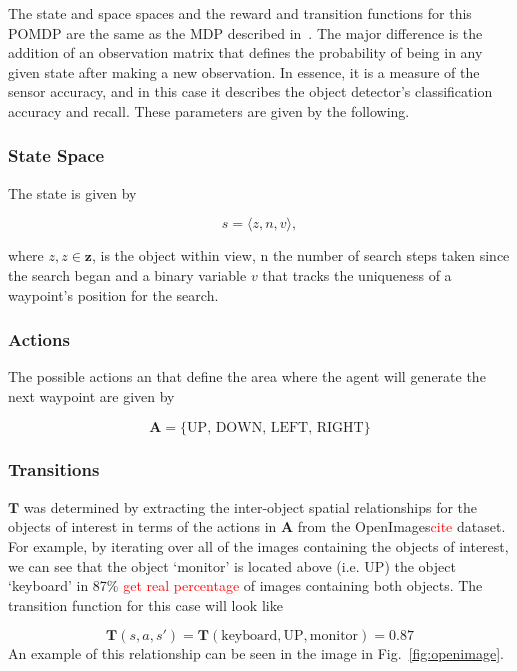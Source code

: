 \documentclass[runningheads]{llncs}
\newcommand\todo[1]{\textcolor{red}{#1}}
\begin{document}
The state and space spaces and the reward and transition functions for this POMDP are the same as the MDP described in~\cite{lock2019active}. 
The major difference is the addition of an observation matrix that defines the probability of being in any given state after making a new observation.
In essence, it is a measure of the sensor accuracy, and in this case it describes the object detector's classification accuracy and recall.
These parameters are given by the following. 

\subsubsection{State Space}

The state is given by

\begin{equation}
  s = \langle z, n, v \rangle,
\end{equation}

\noindent where $z, z\in\mathbf{z}$, is the object within view, n the number of search steps taken since the search began and a binary variable $v$ that tracks the uniqueness of a waypoint's position for the search.

\subsubsection{Actions}

The possible actions an that define the area where the agent will generate the next waypoint are given by

\begin{equation}
  \mathbf{A} = \{ \textrm{UP, DOWN, LEFT, RIGHT} \}
\end{equation}

\subsubsection{Transitions}

$\mathbf{T}$ was determined by extracting the inter-object spatial relationships for the objects of interest in terms of the actions in $\mathbf{A}$ from the OpenImages\todo{cite} dataset. 
For example, by iterating over all of the images containing the objects of interest, we can see that the object `monitor' is located above (i.e. UP) the object `keyboard' in 87\% \todo{get real percentage} of images containing both objects. 
The transition function for this case will look like 

\begin{equation}
  \mathbf{T}(s, a, s') = \mathbf{T}(\textrm{keyboard}, \textrm{UP}, \textrm{monitor}) = 0.87
\end{equation}
An example of this relationship can be seen in the image in Fig.~\ref{fig:openimage}.
\end{document}
